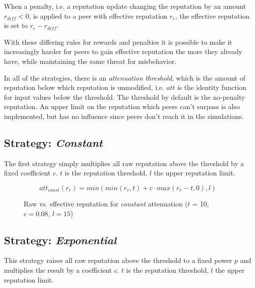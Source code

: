 When a penalty, i.e. a reputation update changing the reputation by an amount
$r_{diff} < 0$, is applied to a peer with effective reputation $r_e$, the
effective reputation is set to $r_e - r_{diff}$.

With these differing rules for rewards and penalties it is possible to make it
increasingly harder for peers to gain effective reputation the more they already
have, while maintaining the same threat for misbehavior.

In all of the strategies, there is an \emph{attenuation threshold}, which is the
amount of reputation below which reputation is unmodified, i.e. $att$ is the
identity function for input values below the threshold. The threshold by default
is the no-penalty reputation. An upper limit on the reputation which peers can't
surpass is also implemented, but has no influence since peers don't reach it in
the simulations.

\subsection{Strategy: \emph{Constant}}
The first strategy simply multiplies all raw reputation above the threshold by a
fixed coefficient $c$. $t$ is the reputation threshold, $l$ the upper reputation
limit.

\[att_{const}(r_r) = min(min(r_r, t) + c \cdot max(r_r - t, 0), l)\]

\begin{figure}[t]
\centering
{}
\caption{Raw vs. effective reputation for \emph{constant} attenuation ($t$ = 10,
$c = 0.08$, $l = 15$)}
\label{fig:att_const_raw_vs_eff}
\end{figure}

\subsection{Strategy: \emph{Exponential}}
This strategy raises all raw reputation above the threshold to a fixed power $p$
and multiplies the result by a coefficient $c$. $t$ is the reputation threshold,
$l$ the upper reputation limit.

